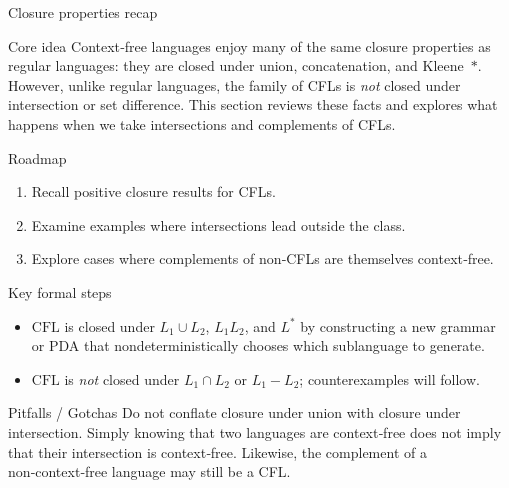 \begin{frame}[t]{Closure properties recap}
  \begin{tblock}{Core idea}
    Context‑free languages enjoy many of the same closure properties as
    regular languages: they are closed under union, concatenation, and
    Kleene $\ast$.  However, unlike regular languages, the family of CFLs is
    \emph{not} closed under intersection or set difference.  This section
    reviews these facts and explores what happens when we take
    intersections and complements of CFLs.
  \end{tblock}
  \begin{tblock}{Roadmap}
    \begin{enumerate}
      \item Recall positive closure results for CFLs.
      \item Examine examples where intersections lead outside the class.
      \item Explore cases where complements of non‑CFLs are themselves
        context‑free.
    \end{enumerate}
  \end{tblock}
  \begin{tblock}{Key formal steps}
    \begin{itemize}
      \item $\mathrm{CFL}$ is closed under $L_1 \cup L_2$, $L_1 L_2$, and
        $L^\ast$ by constructing a new grammar or PDA that nondeterministically
        chooses which sublanguage to generate.
      \item $\mathrm{CFL}$ is \emph{not} closed under $L_1 \cap L_2$ or
        $L_1 - L_2$; counterexamples will follow.
    \end{itemize}
  \end{tblock}
  \begin{talert}{Pitfalls / Gotchas}
    Do not conflate closure under union with closure under intersection.
    Simply knowing that two languages are context‑free does not imply that
    their intersection is context‑free.  Likewise, the complement of a
    non‑context‑free language may still be a CFL.
  \end{talert}
  \label{fr:6.2-01}
\end{frame}

